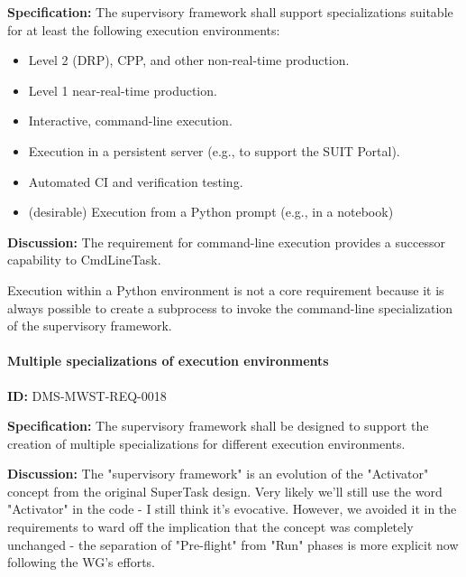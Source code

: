\documentclass[SE,toc,lsstdraft]{lsstdoc}
\begin{document}
\textbf{Specification:}
The supervisory framework shall support specializations suitable for at least the following execution environments:

    \begin{itemize}
\item
Level 2 (DRP), CPP, and other non-real-time production.

\item
Level 1 near-real-time production.

\item
Interactive, command-line execution.

\item
Execution in a persistent server (e.g., to support the SUIT Portal).

\item
Automated CI and verification testing.

\item
(desirable) Execution from a Python prompt (e.g., in a notebook)

    \end{itemize}

\textbf{Discussion:}
The requirement for command-line execution provides a successor capability to CmdLineTask.

Execution within a Python environment is not a core requirement because it is always possible to create a subprocess to invoke the command-line specialization of the supervisory framework.

\paragraph{Multiple specializations of execution environments}\hfill  %

\label{DMS-MWST-REQ-0018}
\textbf{ID:} DMS-MWST-REQ-0018

\textbf{Specification:}
The supervisory framework shall be designed to support the creation of multiple specializations for different execution environments.

\textbf{Discussion:}
The "supervisory framework" is an evolution of the "Activator" concept from the original SuperTask design. Very likely we'll still use the word "Activator" in the code - I still think it's evocative. However, we avoided it in the requirements to ward off the implication that the concept was completely unchanged - the separation of "Pre-flight" from "Run" phases is more explicit now following the WG's efforts.
\end{document}
